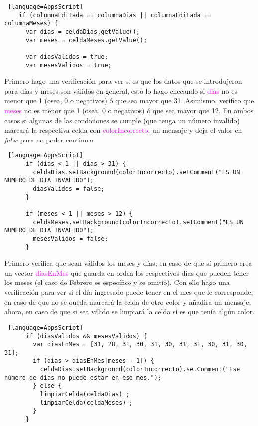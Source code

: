 \documentclass[12pt]{article} %
\begin{document}
    \begin{lstlisting} [language=AppsScript]
    if (columnaEditada == columnaDias || columnaEditada == columnaMeses) {
      var dias = celdaDias.getValue();
      var meses = celdaMeses.getValue();
    
      var diasValidos = true;
      var mesesValidos = true;

      \end{lstlisting}

    Primero hago una verificación para ver si es que los datos que se introdujeron para días y meses son válidos en general, esto lo hago checando si \textcolor{magenta}{dias} no es menor que 1 (osea, 0 o negativos) ó que sea mayor que 31. Asimismo, verifico que \textcolor{magenta}{meses} no es menor que 1 (osea, 0 o negativos) ó que sea mayor que 12. En ambos casos si algunas de las condiciones se cumple (que tenga un número invalido) marcará la respectiva celda con \textcolor{magenta}{colorIncorrecto}, un mensaje y deja el valor en \textit{false} para no poder continuar
      
    \begin{lstlisting} [language=AppsScript]
      if (dias < 1 || dias > 31) {
        celdaDias.setBackground(colorIncorrecto).setComment("ES UN NUMERO DE DIA INVALIDO");
        diasValidos = false;
      }
      
      if (meses < 1 || meses > 12) {
        celdaMeses.setBackground(colorIncorrecto).setComment("ES UN NUMERO DE DIA INVALIDO");
        mesesValidos = false;
      }
    \end{lstlisting}

    Primero verifica que sean válidos los meses y días, en caso de que sí primero crea un vector \textcolor{magenta}{diasEnMes} que guarda en orden los respectivos días que pueden tener los meses (el caso de Febrero es específico y se omitió). Con ello hago una verificación para ver si el día ingresado puede tener en el mes que le corresponde, en caso de que no se oueda marcará la celda de otro color y añadira un mensaje; ahora, en caso de que si sea válido se limpiará la celda si es que tenía algún color.

    \begin{lstlisting} [language=AppsScript]
      if (diasValidos && mesesValidos) {
        var diasEnMes = [31, 28, 31, 30, 31, 30, 31, 31, 30, 31, 30, 31];
        if (dias > diasEnMes[meses - 1]) {
          celdaDias.setBackground(colorIncorrecto).setComment("Ese número de días no puede estar en ese mes.");
        } else {
          limpiarCelda(celdaDias) ;
          limpiarCelda(celdaMeses) ;
        }
      }
    \end{lstlisting}
\end{document}
